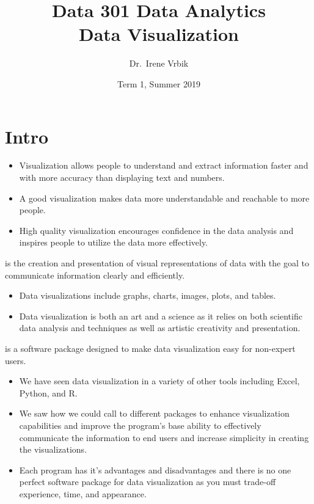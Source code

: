 \documentclass[xcolor=svgnames]{beamer} %
\title
  [Data 301 Data Analytics\hspace{2em}]
  {Data 301 Data Analytics\\
  Data Visualization}
\author
  [Dr.\ Irene Vrbik]
  {Dr.\ Irene Vrbik}
\date
  {Term 1, Summer 2019}
\institute
  {University of British Columbia Okanagan \newline irene.vrbik@ubc.ca}
\begin{document}
\maketitle

\section
  {Intro}
  
  
\begin{frame}
  \begin{itemize}
\item   Visualization allows people to understand and extract information faster and with more accuracy than displaying text and numbers.
\vfill
\item A good visualization makes data more understandable and reachable to more people.
\vfill
\item High quality visualization encourages confidence in the data analysis and inspires people to utilize the data more effectively.
\vfill
  \end{itemize}
\end{frame}






\begin{frame}
 is the creation and presentation of visual representations of data with the goal to communicate information clearly and efficiently.
\vfill
\begin{itemize}
\item Data visualizations include graphs, charts, images, plots, and tables.
\vfill
\item Data visualization is both an art and a science as it relies on both scientific data analysis and techniques as well as artistic creativity and presentation.
\vfill
\end{itemize}
 is a software package designed to make data visualization easy for non-expert users.
\vfill
\end{frame}

\begin{frame}
\begin{itemize}
\item We have seen data visualization in a variety of other tools including Excel, Python, and R.
\vfill
\item We saw how we could call to different packages to enhance visualization capabilities and improve the program's base ability to effectively communicate the information to end users and increase simplicity in creating the visualizations.
\vfill
\item Each program has it's advantages and disadvantages and there is no one perfect software package for data visualization as you must trade-off experience, time, and appearance.
\vfill 
\end{itemize}
\end{frame}
\end{document}
